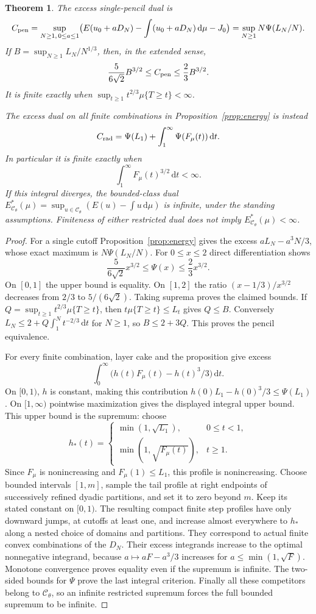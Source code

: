 \documentclass[11pt]{article}
\newtheorem{theorem}{Theorem}
\newcommand{\C}{\mathcal C_\theta}
\begin{document}
\begin{theorem}\label{thm:duals}
The excess single-pencil dual is
\[
 C_{\rm pen}=\sup_{N\geq1,\,0\leq a\leq1}
       \bigl(E(u_0+aD_N)-\int(u_0+aD_N)\,\mathrm d\mu-J_0\bigr)
          =\sup_{N\geq1}N\Psi(L_N/N).
\]
If $B=\sup_{N\geq1} L_N/N^{1/3}$, then, in the extended sense,
\[
 \frac5{6\sqrt2}B^{3/2}\leq C_{\rm pen}\leq\frac23B^{3/2}.
\]
It is finite exactly when
$\sup_{t\geq1}t^{2/3}\mu\{T\geq t\}<\infty$.

The excess dual on all finite combinations in Proposition~\ref{prop:energy}
is instead
\[
 C_{\rm rad}=\Psi(L_1)+\int_1^\infty\Psi(F_\mu(t))\,\mathrm dt.
\]
In particular it is finite exactly when
\[
                    \int_1^\infty F_\mu(t)^{3/2}\,\mathrm dt<\infty.
\]
If this integral diverges, the bounded-class dual
$E^*_{\C}(\mu)=\sup_{u\in\C}(E(u)-\int u\,\mathrm d\mu)$
is infinite, under the standing assumptions. Finiteness of either
restricted dual does not imply $E^*_{\C}(\mu)<\infty$.
\end{theorem}
\begin{proof}
For a single cutoff Proposition~\ref{prop:energy} gives the excess
$aL_N-a^3N/3$, whose exact maximum is $N\Psi(L_N/N)$.
For $0\leq x\leq2$ direct differentiation shows
\[
 \frac5{6\sqrt2}x^{3/2}\leq\Psi(x)\leq\frac23x^{3/2}.
\]
On $[0,1]$ the upper bound is equality. On $[1,2]$ the ratio
$(x-1/3)/x^{3/2}$ decreases from $2/3$ to $5/(6\sqrt2)$.
Taking suprema proves the claimed bounds.
If $Q=\sup_{t\geq1}t^{2/3}\mu\{T\geq t\}$, then
$t\mu\{T\geq t\}\leq L_t$ gives $Q\leq B$.
Conversely $L_N\leq2+Q\int_1^N t^{-2/3}\,\mathrm dt$
for $N\geq1$, so $B\leq2+3Q$. This proves the pencil equivalence.

For every finite combination, layer cake and the proposition give excess
\[
       \int_0^\infty\bigl(h(t)F_\mu(t)-h(t)^3/3\bigr)\,\mathrm dt.
\]
On $[0,1)$, $h$ is constant, making this contribution
$h(0)L_1-h(0)^3/3\leq\Psi(L_1)$.
On $[1,\infty)$ pointwise maximization gives the displayed integral
upper bound. This upper bound is the supremum: choose
\[
 h_*(t)=\begin{cases}
    \min(1,\sqrt{L_1}),&0\leq t<1,\\
    \min(1,\sqrt{F_\mu(t)}),&t\geq1.
 \end{cases}
\]
Since $F_\mu$ is nonincreasing and $F_\mu(1)\leq L_1$, this profile
is nonincreasing. Choose bounded intervals $[1,m]$, sample the tail
profile at right endpoints of successively refined dyadic partitions,
and set it to zero beyond $m$. Keep its stated constant on $[0,1)$.
The resulting compact finite step profiles have only downward jumps,
at cutoffs at least one, and increase almost everywhere to $h_*$ along
a nested choice of domains and partitions. They correspond to actual
finite convex combinations of the $D_N$. Their excess integrands
increase to the optimal nonnegative integrand, because
$a\mapsto aF-a^3/3$ increases for $a\leq\min(1,\sqrt F)$.
Monotone convergence proves equality even if the supremum is infinite.
The two-sided bounds for $\Psi$ prove the last integral criterion.
Finally all these competitors belong to $\C$, so an infinite restricted
supremum forces the full bounded supremum to be infinite.
\end{proof}
\end{document}
